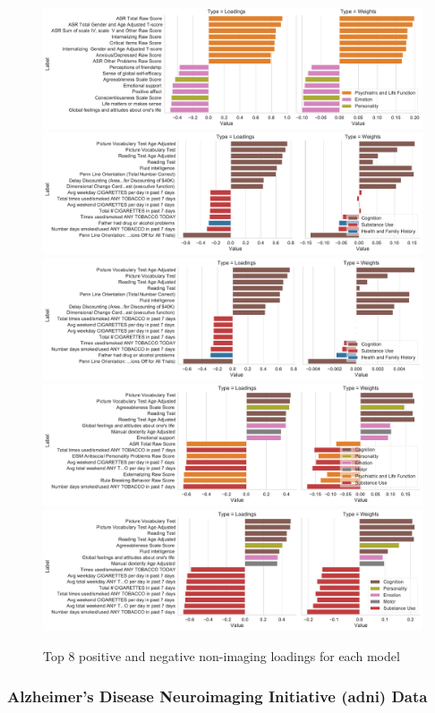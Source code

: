 \begin{figure}
    \centering
    \includegraphics[width=0.8\linewidth]{figures/hcp/PCA behaviour weights and loadings}
    \includegraphics[width=0.8\linewidth]{figures/hcp/RCCA behaviour weights and loadings}
    \includegraphics[width=0.8\linewidth]{figures/hcp/ElasticNet behaviour weights and loadings}
    \includegraphics[width=0.8\linewidth]{figures/hcp/PLS behaviour weights and loadings}
    \includegraphics[width=0.8\linewidth]{figures/hcp/SPLS behaviour weights and loadings}
    \caption{Top 8 positive and negative non-imaging \gls{loadings} for each model}
\end{figure}

\subsubsection{Alzheimer's Disease Neuroimaging Initiative (\acrshort{adni}) Data}

